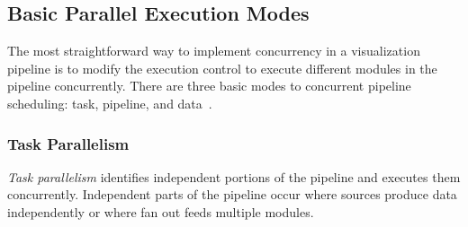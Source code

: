 \documentclass[journal,twocolumn,10pt,letterpaper,twoside]{IEEEtran}
\newcommand*{\lcite}[1]{~\cite{#1}}
\newcommand*{\keyterm}[1]{\emph{#1}}
\begin{document}
\subsection{Basic Parallel Execution Modes}
\label{sec:ParallelExecution:Modes}

The most straightforward way to implement concurrency in a visualization
pipeline is to modify the execution control to execute different modules
in the pipeline concurrently.  There are three basic modes to concurrent
pipeline scheduling: task, pipeline, and data\lcite{Ahrens2000}.

\subsubsection{Task Parallelism}
\label{sec:TaskParallelism}

\keyterm{Task parallelism} identifies independent portions of the pipeline
and executes them concurrently.  Independent parts of the pipeline occur
where sources produce data independently or where fan out feeds multiple
modules.
\end{document}
